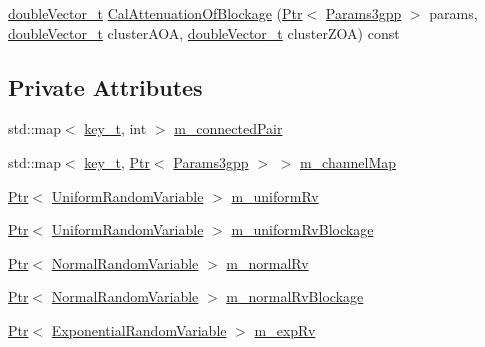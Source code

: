 \begin{DoxyCompactItemize}
\item 
\hyperlink{namespacens3_aa6f1edf6566ca6afec613bc6e40240ea}{double\+Vector\+\_\+t} \hyperlink{classns3_1_1MmWave3gppChannel_aff8853ed48d4aeb1a5d4960a843f5f1a}{Cal\+Attenuation\+Of\+Blockage} (\hyperlink{classns3_1_1Ptr}{Ptr}$<$ \hyperlink{structns3_1_1Params3gpp}{Params3gpp} $>$ params, \hyperlink{namespacens3_aa6f1edf6566ca6afec613bc6e40240ea}{double\+Vector\+\_\+t} cluster\+A\+OA, \hyperlink{namespacens3_aa6f1edf6566ca6afec613bc6e40240ea}{double\+Vector\+\_\+t} cluster\+Z\+OA) const 
\end{DoxyCompactItemize}
\subsection*{Private Attributes}
\begin{DoxyCompactItemize}
\item 
std\+::map$<$ \hyperlink{namespacens3_aa42bd408e172586b3b192acfaa36b070}{key\+\_\+t}, int $>$ \hyperlink{classns3_1_1MmWave3gppChannel_a43ad5b64f557a59c929fa49f3600fd9f}{m\+\_\+connected\+Pair}
\item 
std\+::map$<$ \hyperlink{namespacens3_aa42bd408e172586b3b192acfaa36b070}{key\+\_\+t}, \hyperlink{classns3_1_1Ptr}{Ptr}$<$ \hyperlink{structns3_1_1Params3gpp}{Params3gpp} $>$ $>$ \hyperlink{classns3_1_1MmWave3gppChannel_a31f05f0c8a438b8ce89f29813e863040}{m\+\_\+channel\+Map}
\item 
\hyperlink{classns3_1_1Ptr}{Ptr}$<$ \hyperlink{classns3_1_1UniformRandomVariable}{Uniform\+Random\+Variable} $>$ \hyperlink{classns3_1_1MmWave3gppChannel_ac6493e4d80b717378e74a63d418f8c6f}{m\+\_\+uniform\+Rv}
\item 
\hyperlink{classns3_1_1Ptr}{Ptr}$<$ \hyperlink{classns3_1_1UniformRandomVariable}{Uniform\+Random\+Variable} $>$ \hyperlink{classns3_1_1MmWave3gppChannel_a5afa026ce58c8b70c81c846bb7b49b4f}{m\+\_\+uniform\+Rv\+Blockage}
\item 
\hyperlink{classns3_1_1Ptr}{Ptr}$<$ \hyperlink{classns3_1_1NormalRandomVariable}{Normal\+Random\+Variable} $>$ \hyperlink{classns3_1_1MmWave3gppChannel_ac2e02ebacc72ed96518d785f2dc87c57}{m\+\_\+normal\+Rv}
\item 
\hyperlink{classns3_1_1Ptr}{Ptr}$<$ \hyperlink{classns3_1_1NormalRandomVariable}{Normal\+Random\+Variable} $>$ \hyperlink{classns3_1_1MmWave3gppChannel_a51e89a0f3902e6e377705871c479cf36}{m\+\_\+normal\+Rv\+Blockage}
\item 
\hyperlink{classns3_1_1Ptr}{Ptr}$<$ \hyperlink{classns3_1_1ExponentialRandomVariable}{Exponential\+Random\+Variable} $>$ \hyperlink{classns3_1_1MmWave3gppChannel_a139990a80eb5ae26045b434c0eb75ae4}{m\+\_\+exp\+Rv}

\end{DoxyCompactItemize}
